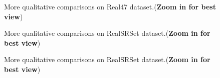 \documentclass{article}
\begin{document}
\begin{figure}[htbp]
    \centering
    \ContinuedFloat {}\hfill

    \hfill
    
    \caption{More qualitative comparisons on Real47 dataset.(\textbf{Zoom in for best view})}
\end{figure}

\begin{figure}[htbp]
    \centering

    \hfill

    \hfill
    
    \caption{More qualitative comparisons on RealSRSet \cite{realsr} dataset.(\textbf{Zoom in for best view})}
    \label{fig:bsr_realsr}
\end{figure}

\begin{figure}[htbp]
    \centering
    \ContinuedFloat 

    \hfill

    \hfill
    
    \caption{More qualitative comparisons on RealSRSet \cite{realsr} dataset.(\textbf{Zoom in for best view})}
\end{figure}
\end{document}
